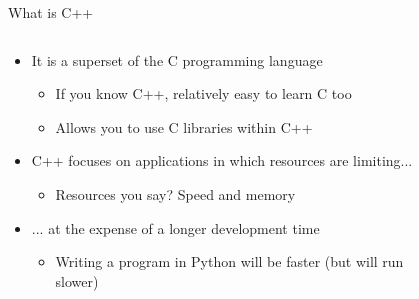 \documentclass{beamer}
\begin{document}
\begin{frame}{What is C++}
    \begin{columns}
        \begin{column}{0.5\textwidth}
            \begin{itemize}
                \item<2-> It is a superset of the C programming language
                    \begin{itemize}
                        \item If you know C++, relatively easy to learn C too 
                        \item Allows you to use C libraries within C++
                    \end{itemize}
                \item<3-> C++ focuses on applications in which resources are limiting...
                    \begin{itemize}
                        \item Resources you say? Speed and memory
                    \end{itemize}
                \item<4-> ... at the expense of a longer development time
                    \begin{itemize}
                        \item Writing a program in Python will be faster (but will run slower)
                    \end{itemize}
            \end{itemize}
        \end{column}
        \begin{column}{0.5\textwidth}
            \begin{figure}

\end{figure}
\end{column}
\end{columns}
\end{frame}
\end{document}
